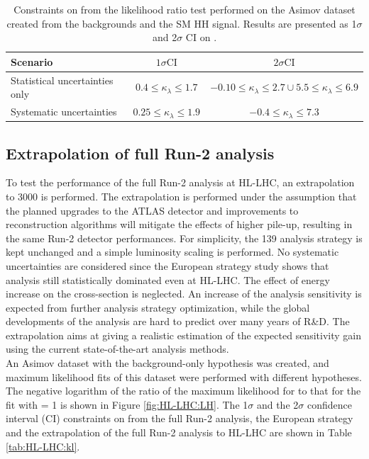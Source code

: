 \begin{table}[htbp]
    \centering
    \begin{tabular}{lcc}
\hline \hline Scenario & $1 \sigma \mathrm{CI}$ & $2 \sigma \mathrm{CI}$ \\
\hline Statistical uncertainties only & $0.4 \leq \kappa_{\lambda} \leq 1.7$ & $-0.10 \leq \kappa_{\lambda} \leq 2.7 \cup 5.5 \leq \kappa_{\lambda} \leq 6.9$ \\
Systematic uncertainties & $0.25 \leq \kappa_{\lambda} \leq 1.9$ & $-0.4 \leq \kappa_{\lambda} \leq 7.3$ \\
\hline \hline
\end{tabular}
    \caption{Constraints on \kl from the likelihood ratio test performed on the Asimov dataset created from the backgrounds and the SM HH signal. Results are presented as 1$\sigma$ and 2$\sigma$ CI on \kl.}
    \label{tab:HL-LHC:Comb:CI}
\end{table}






\subsection{Extrapolation of full Run-2 analysis}

To test the performance of the full Run-2 analysis at HL-LHC, an extrapolation to 3000 \ifb is performed. The extrapolation is performed under the assumption that the planned upgrades to the ATLAS detector and improvements to reconstruction algorithms will mitigate the effects of higher pile-up, resulting in the same Run-2 detector performances. For simplicity, the 139 \ifb analysis strategy is kept unchanged and a simple luminosity scaling is performed. No systematic uncertainties are considered since the European strategy study shows that \bbyy analysis still statistically dominated even at HL-LHC. The effect of energy increase on the cross-section is neglected. An increase of the analysis sensitivity is expected from further analysis strategy optimization, while the global developments of the analysis are hard to predict over many years of R\&D. The extrapolation aims at giving a realistic estimation of the expected sensitivity gain using the current state-of-the-art analysis methods. \\

An Asimov dataset with the background-only hypothesis was created, and maximum likelihood fits of this dataset were performed with different \kl hypotheses. The negative logarithm of the ratio of the maximum likelihood for \kl to that for the fit with \kl= 1 is shown in Figure \ref{fig:HL-LHC:LH}. The 1$\sigma$ and the 2$\sigma$ confidence interval (CI) constraints on \kl from the full Run-2 analysis, the European strategy and the extrapolation of the full Run-2 analysis to HL-LHC are shown in Table \ref{tab:HL-LHC:kl}. 

